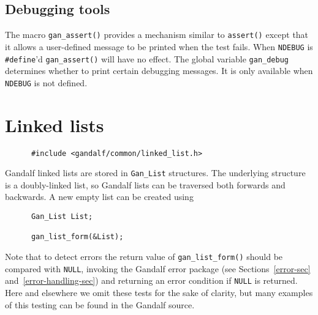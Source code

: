 \subsection{Debugging tools} \label{debugging-tools-sec}
The macro {\tt gan\_assert()} provides a mechanism similar to {\tt assert()}
except that it allows a user-defined message to be printed when the test
fails. When {\tt NDEBUG} is {\tt \#define}'d {\tt gan\_assert()} will have
no effect. The global variable {\tt gan\_debug} determines whether to
print certain debugging messages. It is only available when {\tt NDEBUG}
is not defined.

\section{Linked lists} \label{linked-list-sec}
\begin{verbatim}
      #include <gandalf/common/linked_list.h>
\end{verbatim}
Gandalf linked lists are stored in {\tt Gan\_List} structures.
The underlying structure is a doubly-linked list, so Gandalf lists can be
traversed both forwards and backwards.
A new empty list can be created using
\begin{verbatim}
      Gan_List List;

      gan_list_form(&List);
\end{verbatim}
Note that to detect errors the return value of {\tt gan\_list\_form()}
should be compared with {\tt NULL}, invoking the Gandalf error package
(see Sections~\ref{error-sec} and~\ref{error-handling-sec})
and returning an error condition
if {\tt NULL} is returned. Here and elsewhere we omit these tests for
the sake of clarity, but many examples of this testing can be found in
the Gandalf source.

